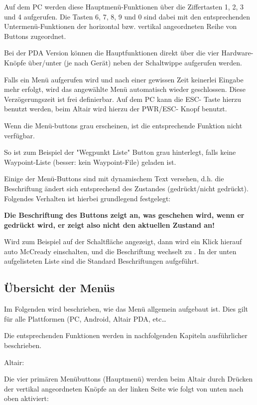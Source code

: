 Auf dem \textsf{PC} werden diese Hauptmenü-Funktionen über die Ziffertasten
1, 2, 3 und  4 aufgerufen. Die Tasten 6, 7, 8, 9 und  0 sind dabei mit den
entsprechenden Untermenü-Funktionen der horizontal bzw.
vertikal angeordneten Reihe von Buttons  zugeordnet.

Bei der PDA Version können die Hauptfunktionen direkt über die vier Hardware-Knöpfe über/unter (je nach Gerät) neben der Schaltwippe aufgerufen werden.

Falls ein Menü aufgerufen wird und nach einer gewissen Zeit keinerlei Eingabe mehr erfolgt, wird das angewählte Menü automatisch wieder geschlossen.  Diese Verzögerungszeit ist frei definierbar.  Auf dem \textsf{PC} kann die ESC- Taste hierzu benutzt werden, beim  \textsf{Altair} wird hierzu der PWR/ESC- Knopf benutzt.

Wenn die Menü-buttons grau erscheinen, ist die entsprechende Funktion nicht verfügbar.

So ist zum Beispiel der "Wegpunkt Liste"  Button grau hinterlegt, falls keine Waypoint-Liste (besser: kein Waypoint-File) geladen ist.

Einige der Menü-Buttons sind mit dynamischem Text versehen, d.h. die Beschriftung ändert sich entsprechend des Zustandes (gedrückt/nicht gedrückt). Folgendes Verhalten ist hierbei grundlegend festgelegt:


\textbf{Die Beschriftung des Buttons zeigt an,\textcolor[rgb]{0.72,0.03,0.20}{ was geschehen wird}, wenn er gedrückt wird, er zeigt also nicht den aktuellen Zustand an!}

Wird zum Beispiel auf der Schaltfläche   angezeigt, dann wird ein Klick hierauf  auto
McCready einschalten, und die Beschriftung wechselt zu  .
In der unten aufgelisteten Liste sind die Standard Beschriftungen aufgeführt.

\subsection*{Übersicht der Menüs }
Im Folgenden wird beschrieben, wie das Menü allgemein aufgebaut ist.
Dies gilt für alle Plattformen (\textsf{PC}, Android, \textsf{Altair} PDA, etc\dots

Die entsprechenden Funktionen werden in nachfolgenden Kapiteln ausführlicher beschrieben.

\textsf{\textsf{Altair}}:

Die vier primären Menübuttons (Hauptmenü) werden beim \textsf{Altair} durch Drücken der vertikal angeordneten Knöpfe an der linken Seite wie folgt von unten nach oben aktiviert:

